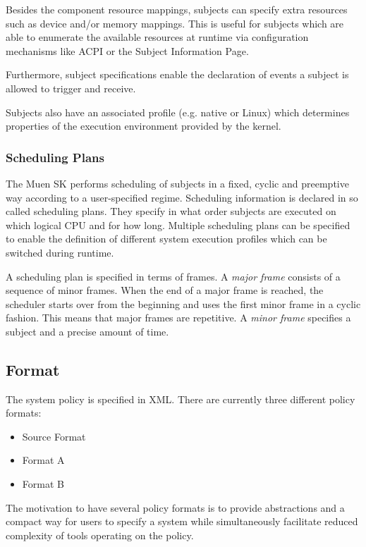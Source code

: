 \documentclass[a4paper,twoside,titlepage]{article}
\begin{document}
Besides the component resource mappings, subjects can specify extra resources
such as device and/or memory mappings. This is useful for subjects which are
able to enumerate the available resources at runtime via configuration
mechanisms like ACPI or the Subject Information Page.

Furthermore, subject specifications enable the declaration of events a subject
is allowed to trigger and receive.

Subjects also have an associated profile (e.g. native or Linux) which determines
properties of the execution environment provided by the kernel.

\subsubsection{Scheduling Plans}
The Muen SK performs scheduling of subjects in a fixed, cyclic and
preemptive way according to a user-specified regime. Scheduling information is
declared in so called scheduling plans. They specify in what order subjects are
executed on which logical CPU and for how long. Multiple scheduling plans can be
specified to enable the definition of different system execution profiles which
can be switched during runtime.

A scheduling plan is specified in terms of frames. A \emph{major frame} consists
of a sequence of minor frames. When the end of a major frame is reached, the
scheduler starts over from the beginning and uses the first minor frame in a
cyclic fashion. This means that major frames are repetitive. A
\emph{minor frame} specifies a subject and a precise amount of time.

\subsection{Format}
The system policy is specified in XML. There are currently three different
policy formats:

\begin{itemize}
	\item Source Format
	\item Format A
	\item Format B
\end{itemize}

The motivation to have several policy formats is to provide abstractions and a
compact way for users to specify a system while simultaneously facilitate
reduced complexity of tools operating on the policy.
\end{document}
